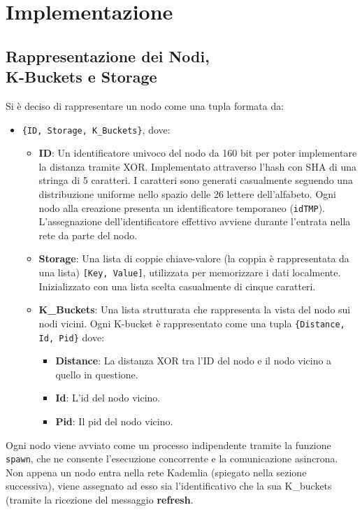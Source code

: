 \documentclass{article}
\begin{document}
\section{Implementazione}
\subsection{Rappresentazione dei Nodi,\\ K-Buckets e Storage}
Si è deciso di rappresentare un nodo come una tupla formata da:
\begin{itemize}
    \item \texttt{\{ID, Storage, K\_Buckets\}}, dove:
    \begin{itemize}
        \item \textbf{ID}: Un identificatore univoco del nodo da 160 bit per poter implementare la distanza tramite XOR. Implementato attraverso l'hash con SHA di una stringa di 5 caratteri. I caratteri sono generati casualmente seguendo una distribuzione uniforme nello spazio delle 26 lettere dell'alfabeto. Ogni nodo alla creazione presenta un identificatore temporaneo (\texttt{idTMP}). L'assegnazione dell'identificatore effettivo avviene durante l'entrata nella rete da parte del nodo.
        \item \textbf{Storage}: Una lista di coppie chiave-valore (la coppia è rappresentata da una lista) \texttt{[Key, Value]}, utilizzata per memorizzare i dati localmente. Inizializzato con una lista scelta casualmente di cinque caratteri.
        \item \textbf{K\_Buckets}: Una lista strutturata che rappresenta la vista del nodo sui nodi vicini. Ogni K-bucket è rappresentato come una tupla \texttt{\{Distance, Id, Pid\}} dove:
        \begin{itemize}
            \item \textbf{Distance}: La distanza XOR tra l'ID del nodo e il nodo vicino a quello in questione.
            \item \textbf{Id}: L'id del nodo vicino.
            \item \textbf{Pid}: Il pid del nodo vicino.
        \end{itemize}
    \end{itemize}
\end{itemize}

Ogni nodo viene avviato come un processo indipendente tramite la funzione \texttt{spawn}, che ne consente l'esecuzione concorrente e la comunicazione asincrona.\\
Non appena un nodo entra nella rete Kademlia (spiegato nella sezione successiva), viene assegnato ad esso sia l'identificativo che la sua K\_buckets (tramite la ricezione del messaggio \textbf{refresh}.
\end{document}
